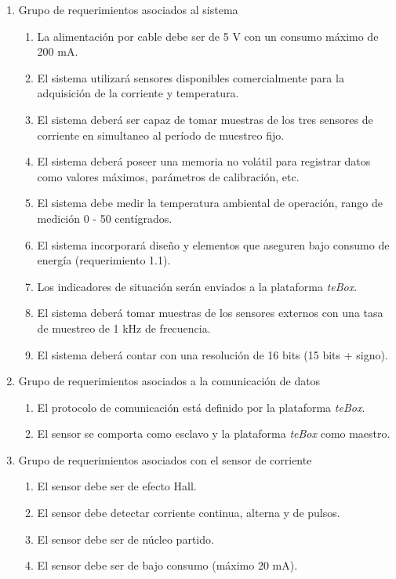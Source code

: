 \documentclass[11pt]{charter}
\begin{document}
\begin{enumerate}
\item Grupo de requerimientos asociados al sistema
	\begin{enumerate}
	\item La alimentación por cable debe ser de 5 V con un consumo máximo de 200 mA. \label{req1}
	\item El sistema utilizará sensores disponibles comercialmente para la adquisición de la corriente y temperatura.
	\item El sistema deberá ser capaz de tomar muestras de los tres sensores de corriente en simultaneo al período de muestreo fijo.
	\item El sistema deberá poseer una memoria no volátil para registrar datos como valores máximos, parámetros de calibración, etc. 
	\item El sistema debe medir la temperatura ambiental de operación, rango de medición 0 - 50 centígrados.
	\item El sistema incorporará diseño y elementos que aseguren bajo consumo de energía (requerimiento 1.1).
	\item Los indicadores de situación serán enviados a la plataforma \textit{teBox}.
	\item El sistema deberá tomar muestras de los sensores externos con una tasa de muestreo de 1 kHz de frecuencia.
	\item El sistema deberá contar con una resolución de 16 bits (15 bits + signo).
	\end{enumerate}
\item Grupo de requerimientos asociados a la comunicación de datos
	\begin{enumerate}
	\item El protocolo de comunicación está definido por la plataforma \textit{teBox}.
	\item El sensor se comporta como esclavo y la plataforma \textit{teBox} como maestro.
	\end{enumerate}
\item Grupo de requerimientos asociados con el sensor de corriente
	\begin{enumerate}
	\item El sensor debe ser de efecto Hall.
	\item El sensor debe detectar corriente continua, alterna y de pulsos.
	\item El sensor debe ser de núcleo partido.
	\item El sensor debe ser de bajo consumo (máximo 20 mA).

\end{enumerate}
\end{enumerate}
\end{document}
